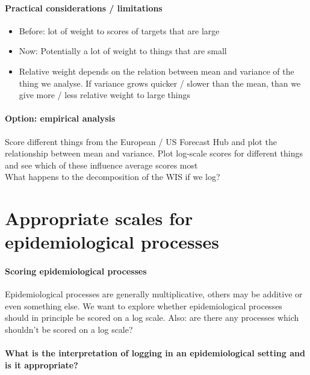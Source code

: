 \documentclass{article}
\begin{document}
\paragraph{Practical considerations / limitations}

\begin{itemize}
    \item Before: lot of weight to scores of targets that are large
    \item Now: Potentially a lot of weight to things that are small
    \item Relative weight depends on the relation between mean and variance of the thing we analyse. If variance grows quicker / slower than the mean, than we give more / less relative weight to large things
\end{itemize}

\paragraph{Option: empirical analysis} 
Score different things from the European / US Forecast Hub and plot the relationship between mean and variance. Plot log-scale scores for different things and see which of these influence average scores most \\
What happens to the decomposition of the WIS if we log? 



\section{Appropriate scales for epidemiological processes}

\paragraph{Scoring epidemiological processes}
Epidemiological processes are generally multiplicative, others may be additive or even something else. We want to explore whether epidemiological processes should in principle be scored on a log scale. Also: are there any processes which shouldn't be scored on a log scale? 

\paragraph{What is the interpretation of logging in an epidemiological setting and is it appropriate?}
\end{document}
